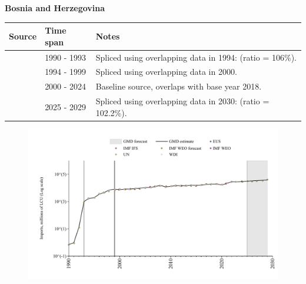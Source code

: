 \documentclass[12pt,a4paper,landscape]{article}
\begin{document}
\begin{adjustbox}{max totalsize={\paperwidth}{\paperheight},center}
\begin{minipage}[t][\textheight][t]{\textwidth}
\vspace*{0.5cm}
{}
\begin{center}
{\Large\bfseries Bosnia and Herzegovina}
\end{center}
\vspace{0.5cm}
\begin{table}[H]
\centering
\small
\begin{tabular}{|l|l|l|}
\hline
\textbf{Source} & \textbf{Time span} & \textbf{Notes} \\
\hline
\rowcolor{white}\cite{UN}& 1990 - 1993 &Spliced using overlapping data in 1994: (ratio = 106\%).\\
\rowcolor{lightgray}\cite{WDI}& 1994 - 1999 &Spliced using overlapping data in 2000.\\
\rowcolor{white}\cite{EUS}& 2000 - 2024 &Baseline source, overlaps with base year 2018.\\
\rowcolor{lightgray}\cite{IMF_WEO_forecast}& 2025 - 2029 &Spliced using overlapping data in 2030: (ratio = 102.2\%).\\
\hline
\end{tabular}
\end{table}
\begin{figure}[H]
\centering
\includegraphics[width=\textwidth,height=0.6\textheight,keepaspectratio]{graphs/BIH_imports.pdf}
\end{figure}
\end{minipage}
\end{adjustbox}
\end{document}
